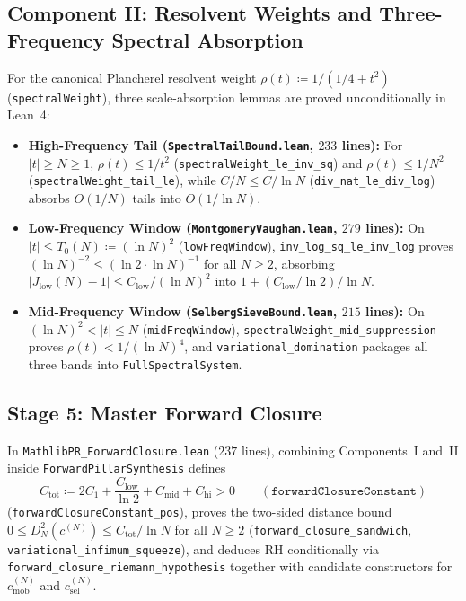 \documentclass[11pt,a4paper]{article}
\theoremstyle{definition}
\begin{document}
\subsection{Component II: Resolvent Weights and Three-Frequency Spectral Absorption}
For the canonical Plancherel resolvent weight $\rho(t) \coloneqq 1 / (1/4 + t^2)$ (\texttt{spectralWeight}), three scale-absorption lemmas are proved unconditionally in Lean~4:
\begin{itemize}[noitemsep]
  \item \textbf{High-Frequency Tail (\texttt{SpectralTailBound.lean}, $233$ lines):} For $|t| \ge N \ge 1$, $\rho(t) \le 1/t^2$ (\texttt{spectralWeight\_\allowbreak le\_\allowbreak inv\_\allowbreak sq}) and $\rho(t) \le 1/N^2$ (\texttt{spectralWeight\_\allowbreak tail\_\allowbreak le}), while $C/N \le C/\ln N$ (\texttt{div\_\allowbreak nat\_\allowbreak le\_\allowbreak div\_\allowbreak log}) absorbs $O(1/N)$ tails into $O(1/\ln N)$.
  \item \textbf{Low-Frequency Window (\texttt{MontgomeryVaughan.lean}, $279$ lines):} On $|t| \le T_0(N) \coloneqq (\ln N)^2$ (\texttt{lowFreqWindow}), \texttt{inv\_\allowbreak log\_\allowbreak sq\_\allowbreak le\_\allowbreak inv\_\allowbreak log} proves $(\ln N)^{-2} \le (\ln 2 \cdot \ln N)^{-1}$ for all $N \ge 2$, absorbing $|J_{\mathrm{low}}(N) - 1| \le C_{\mathrm{low}}/(\ln N)^2$ into $1 + (C_{\mathrm{low}}/\ln 2)/\ln N$.
  \item \textbf{Mid-Frequency Window (\texttt{SelbergSieveBound.lean}, $215$ lines):} On $(\ln N)^2 < |t| \le N$ (\texttt{midFreqWindow}), \texttt{spectralWeight\_\allowbreak mid\_\allowbreak suppression} proves $\rho(t) < 1/(\ln N)^4$, and \texttt{variational\_\allowbreak domination} packages all three bands into \texttt{FullSpectralSystem}.
\end{itemize}

\subsection{Stage 5: Master Forward Closure}
In \texttt{MathlibPR\_\allowbreak ForwardClosure.lean} ($237$ lines), combining Components~I and~II inside \texttt{ForwardPillarSynthesis} defines
\begin{equation}
C_{\mathrm{tot}} \coloneqq 2 C_1 + \frac{C_{\mathrm{low}}}{\ln 2} + C_{\mathrm{mid}} + C_{\mathrm{hi}} > 0 \qquad (\texttt{forwardClosureConstant})
\end{equation}
(\texttt{forwardClosureConstant\_\allowbreak pos}), proves the two-sided distance bound $0 \le D_N^2(c^{(N)}) \le C_{\mathrm{tot}} / \ln N$ for all $N \ge 2$ (\texttt{forward\_\allowbreak closure\_\allowbreak sandwich}, \texttt{variational\_\allowbreak infimum\_\allowbreak squeeze}), and deduces RH conditionally via \texttt{forward\_\allowbreak closure\_\allowbreak riemann\_\allowbreak hypothesis} together with candidate constructors for $c_{\mathrm{mob}}^{(N)}$ and $c_{\mathrm{sel}}^{(N)}$.
\end{document}
